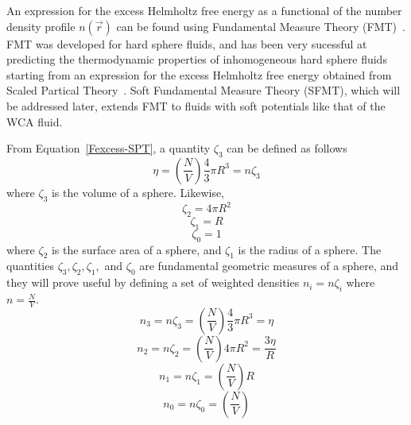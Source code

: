 \documentclass[double,12pt]{beavtex}
\begin{document}
An expression for the excess Helmholtz free energy as a functional of the 
number density profile $n(\vec r)$ can be found using Fundamental Measure 
Theory (FMT)~\cite{rosenfeld1989}. FMT was developed for hard sphere fluids, and has been very 
sucessful at predicting the thermodynamic properties of inhomogeneous hard 
sphere fluids starting from an expression for the excess Helmholtz free 
energy obtained from Scaled Partical Theory~\cite{santos2012phi3}. 
Soft Fundamental Measure Theory (SFMT), which will be addressed later, 
extends FMT to fluids with soft potentials like that of the WCA fluid.

From Equation~\ref{Fexcess-SPT}, a quantity $\zeta_{3}$ can be defined as follows
\begin{equation}{\eta =\left(\frac{N}{V}\right)\frac{4}{3}\pi{R^3}=n\zeta_{3}}\end{equation}
where $\zeta_{3}$ is the volume of a sphere. Likewise,
\begin{equation}{\zeta_{2}=4\pi{R^2}}\end{equation}
\begin{equation}{\zeta_{1}=R}\end{equation}
\begin{equation}{\zeta_{0}=1}\end{equation}
where $\zeta_{2}$ is the surface area of a sphere, and $\zeta_{1}$ is the 
radius of a sphere. The quantities $\zeta_{3}, \zeta_{2}, \zeta_{1},$ 
and $\zeta_{0}$ are fundamental geometric measures of a sphere, and they 
will prove useful by defining a set of weighted densities $n_{i}=n\zeta_{i}$ 
where $n=\frac{N}{V}$. 
\begin{equation}\label{n3}{n_{3}=n\zeta_{3}=\left(\frac{N}{V}\right)\frac{4}{3}\pi{R^3}=\eta}\end{equation}
\begin{equation}\label{n2}{n_{2}=n\zeta_{2}=\left(\frac{N}{V}\right)4\pi{R^2}=\frac{3\eta}{R}}\end{equation}
\begin{equation}\label{n1}{n_{1}=n\zeta_{1}=\left(\frac{N}{V}\right)R}\end{equation}
\begin{equation}\label{n0}{n_{0}=n\zeta_{0}=\left(\frac{N}{V}\right)}\end{equation}
\end{document}

